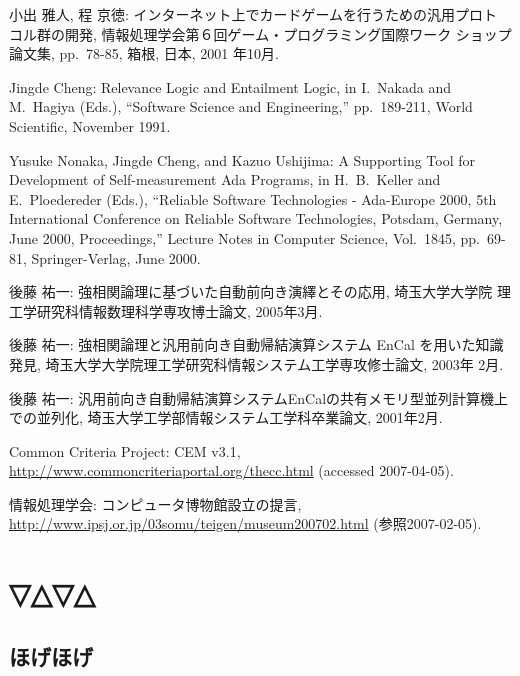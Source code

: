 \documentclass[12pt,epsf]{jreport}
\begin{document}
\begin{thebibliography}{99}
小出 雅人, 程 京徳: インターネット上でカードゲームを行うための汎用プロト
        コル群の開発, 情報処理学会第６回ゲーム・プログラミング国際ワーク
        ショップ論文集, pp.\ 78-85, 箱根, 日本, 2001 年10月.

Jingde Cheng: Relevance Logic and Entailment Logic, in I.\ Nakada and
        M.\ Hagiya (Eds.), ``Software Science and Engineering,''
        pp.\ 189-211, World Scientific, November 1991.

Yusuke Nonaka, Jingde Cheng, and Kazuo Ushijima: A Supporting Tool for
        Development of Self-measurement Ada Programs, in H.\ B.\ Keller
        and E.\ Ploedereder (Eds.), ``Reliable Software Technologies -
        Ada-Europe 2000, 5th International Conference on Reliable
        Software Technologies, Potsdam, Germany, June 2000,
        Proceedings,'' Lecture Notes in Computer Science, Vol.\ 1845,
        pp.\ 69-81, Springer-Verlag, June 2000.


後藤 祐一: 強相関論理に基づいた自動前向き演繹とその応用, 埼玉大学大学院
	理工学研究科情報数理科学専攻博士論文, 2005年3月.

後藤 祐一: 強相関論理と汎用前向き自動帰結演算システム EnCal を用いた知識
	発見, 埼玉大学大学院理工学研究科情報システム工学専攻修士論文, 2003年
	2月.

後藤 祐一: 汎用前向き自動帰結演算システムEnCalの共有メモリ型並列計算機上
	での並列化, 埼玉大学工学部情報システム工学科卒業論文, 2001年2月.


Common Criteria Project: CEM v3.1,
\url{http://www.commoncriteriaportal.org/thecc.html}
(accessed 2007-04-05).

情報処理学会: コンピュータ博物館設立の提言, \url{http://www.ipsj.or.jp/03somu/teigen/museum200702.html} (参照2007-02-05).

\end{thebibliography}

\appendix %
\chapter{▽△▽△}
\section{ほげほげ}
\end{document}
